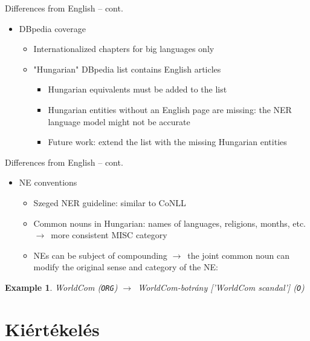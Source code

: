 \documentclass[utf8x,t]{beamer}
\newcommand{\vitem}{\item \vspace{4pt}}
\newcommand{\nyil}{$\rightarrow$\ }
\newtheorem{Examplee}{Example}[section]
\begin{document}
\begin{frame}{Differences from English -- cont.}
  \bigskip
  \begin{itemize}
  \vitem DBpedia coverage
    \smallskip
    \begin{itemize}
    \vitem Internationalized chapters for big languages only
    \vitem "Hungarian" DBpedia list contains English articles %
      \begin{itemize}
      \vitem Hungarian equivalents must be added to the list %
      \vitem Hungarian entities without an English page are missing:
             the NER language model might not be accurate
      \vitem Future work: extend the list with the missing Hungarian entities
      \end{itemize}
    \end{itemize}
  \end{itemize}
\end{frame}

\begin{frame}{Differences from English -- cont.}
  \bigskip
  \begin{itemize}
  \vitem NE conventions
    \smallskip
    \begin{itemize}
    \vitem Szeged NER guideline: similar to CoNLL
    \vitem Common nouns in Hungarian: names of languages, religions, months, etc. \nyil more consistent MISC category
    \vitem NEs can be subject of compounding \nyil the joint common noun can modify the original sense and category of the NE:
    \end{itemize}
  \end{itemize}
  \bigskip
  \begin{Examplee}
  \small{WorldCom {\normalfont(\texttt{ORG})} \nyil WorldCom-botrány ['WorldCom scandal'] {\normalfont(\texttt{O})}}
  \end{Examplee}
\end{frame}

\section{Kiértékelés}





\end{document}
